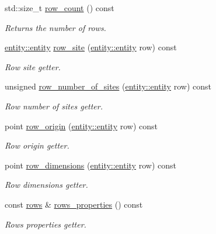 \begin{DoxyCompactItemize}
std\-::size\-\_\-t \hyperlink{classophidian_1_1floorplan_1_1floorplan_a885d82c7486f55f0954503e29b30302a}{row\-\_\-count} () const 
\begin{DoxyCompactList}\small\item\em Returns the number of rows. \end{DoxyCompactList}\item 
\hyperlink{classophidian_1_1entity_1_1entity}{entity\-::entity} \hyperlink{classophidian_1_1floorplan_1_1floorplan_aaefd3a9811ccf325870a770f6fcf567b}{row\-\_\-site} (\hyperlink{classophidian_1_1entity_1_1entity}{entity\-::entity} row) const 
\begin{DoxyCompactList}\small\item\em Row site getter. \end{DoxyCompactList}\item 
unsigned \hyperlink{classophidian_1_1floorplan_1_1floorplan_ad3061c1c80f5767a35f40f8abc120f5a}{row\-\_\-number\-\_\-of\-\_\-sites} (\hyperlink{classophidian_1_1entity_1_1entity}{entity\-::entity} row) const 
\begin{DoxyCompactList}\small\item\em Row number of sites getter. \end{DoxyCompactList}\item 
point \hyperlink{classophidian_1_1floorplan_1_1floorplan_acd1a51329315d13aa2137757f6249546}{row\-\_\-origin} (\hyperlink{classophidian_1_1entity_1_1entity}{entity\-::entity} row) const 
\begin{DoxyCompactList}\small\item\em Row origin getter. \end{DoxyCompactList}\item 
point \hyperlink{classophidian_1_1floorplan_1_1floorplan_a77a8ac7e9f4bf139179466e6ff320047}{row\-\_\-dimensions} (\hyperlink{classophidian_1_1entity_1_1entity}{entity\-::entity} row) const 
\begin{DoxyCompactList}\small\item\em Row dimensions getter. \end{DoxyCompactList}\item 
const \hyperlink{classophidian_1_1floorplan_1_1rows}{rows} \& \hyperlink{classophidian_1_1floorplan_1_1floorplan_a7afdd1bd041f85a4e404e6524bdfcc13}{rows\-\_\-properties} () const 
\begin{DoxyCompactList}\small\item\em Rows properties getter. \end{DoxyCompactList}\end{DoxyCompactItemize}


